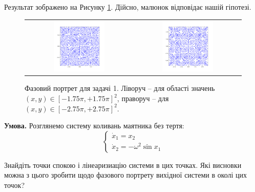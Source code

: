 \documentclass[oneside,solution]{tmpl}
\begin{document}
Результат зображено на Рисунку \ref{fig:problem_1}. Дійсно, малюнок відповідає нашій гіпотезі.

\begin{figure}
\begin{tabular}{cc}
  \includegraphics[width=0.5\textwidth]{images/hw_5/phase_portrait_1.png} &   \includegraphics[width=0.5\textwidth]{images/hw_5/phase_portrait_2.png}
\end{tabular}
    \caption{Фазовий портрет для задачі 1. Ліворуч -- для області значень $(x,y) \in [-1.75\pi, +1.75\pi]^2$, праворуч -- для $(x,y) \in [-2.75\pi,+2.75\pi]^2$.}
    \label{fig:problem_1}
\end{figure}


\textbf{Умова.} Розглянемо систему коливань маятника без тертя:
\begin{equation}
    \begin{cases}
        \dot{x}_1 = x_2 \\
        \dot{x}_2 = -\omega^2 \sin x_1
    \end{cases}
\end{equation}

Знайдіть точки спокою і лінеаризиацію системи в цих точках. Які висновки можна з цього зробити щодо фазового портрету вихідної системи в околі цих точок?
\end{document}
